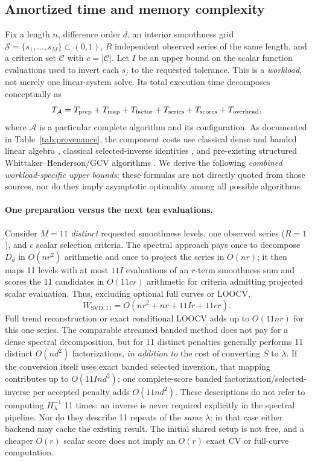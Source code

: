 \subsection{Amortized time and memory complexity}\label{sec:complexity}
Fix a length $n$, difference order $d$, an interior smoothness grid $\mathcal S=\{s_1,\ldots,s_M\}\subset(0,1)$, $R$ independent observed series of the same length, and a criterion set $\mathcal C$ with $c=|\mathcal C|$. Let $I$ be an upper bound on the scalar function evaluations used to invert each $s_j$ to the requested tolerance. This is a \emph{workload}, not merely one linear-system solve. Its total execution time decomposes conceptually as
\begin{equation}\label{eq:costpartition}
T_{\mathcal A}=T_{\rm prep}+T_{\rm map}
 +T_{\rm factor}+T_{\rm series}+T_{\rm scores}+T_{\rm overhead},
\end{equation}
where $\mathcal A$ is a particular complete algorithm and its configuration. As documented in Table~\ref{tab:provenance}, the component costs use classical dense and banded linear algebra \citep{golubvanloan2013,davis2006}, classical selected-inverse identities \citep{erisman1975}, and pre-existing structured Whittaker--Henderson/GCV algorithms \citep{weinert2007}. We derive the following \emph{combined workload-specific upper bounds}; these formulas are not directly quoted from those sources, nor do they imply asymptotic optimality among all possible algorithms.

\paragraph{One preparation versus the next ten evaluations.}
Consider $M=11$ \emph{distinct} requested smoothness levels,
one observed series ($R=1$), and $c$ scalar selection
criteria. The spectral approach pays once to decompose
$D_d$ in $O(nr^2)$ arithmetic and once to project the series
in $O(nr)$; it then maps 11 levels with at most
$11I$ evaluations of an $r$-term smoothness sum and
scores the 11 candidates in $O(11cr)$ arithmetic
for criteria admitting projected scalar evaluation.
Thus, excluding optional full curves or LOOCV,
\begin{equation}\label{eq:eleven-svd}
W_{\mathrm{SVD},11}
=O(nr^2+nr+11Ir+11cr).
\end{equation}
Full trend reconstruction or exact conditional LOOCV
adds up to $O(11nr)$ for this one series.
The comparable streamed banded method does not pay
for a dense spectral decomposition, but for
11 distinct penalties generally performs 11 distinct
$O(nd^2)$ factorizations, \emph{in addition to}
the cost of converting $S$ to $\lambda$.
If the conversion itself uses exact banded selected
inversion, that mapping contributes up to
$O(11I nd^2)$; one complete-score banded
factorization/selected-inverse per accepted penalty
adds $O(11nd^2)$.
These descriptions do not refer to computing
$H_\lambda^{-1}$ 11 times: an inverse is never
required explicitly in the spectral pipeline.
Nor do they describe 11 repeats of the
\emph{same} $\lambda$: in that case either backend
may cache the existing result. The initial shared
setup is not free, and a cheaper $O(r)$ scalar
score does not imply an $O(r)$ exact CV or
full-curve computation.

